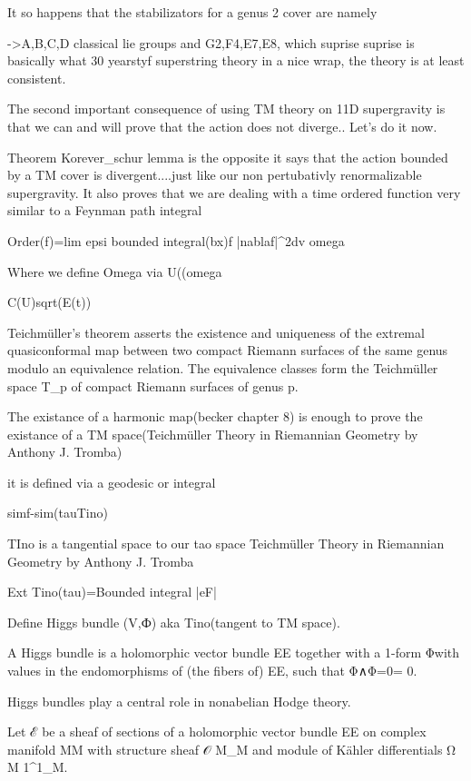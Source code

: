 It so happens that the stabilizators for a genus 2 cover are namely

->A,B,C,D classical lie groups and G2,F4,E7,E8, which suprise suprise is basically what 30 yearstyf superstring theory in a nice wrap, the theory is at least consistent.

The second important consequence of using TM theory on 11D supergravity is that we can and will prove that the action does not diverge.. Let's do it now.

Theorem Korever_schur lemma is the opposite it says that the action bounded by a TM cover is divergent....just like our non pertubativly renormalizable supergravity. It also proves that we are dealing with a time ordered function very similar to a Feynman path integral

Order(f)=lim epsi bounded integral(bx)f |nablaf|^2dv omega

Where we define Omega via U((omega 

C(U)sqrt(E(t))



Teichmüller's theorem asserts the existence and uniqueness of the extremal quasiconformal map between two compact Riemann surfaces of the same genus modulo an equivalence relation. The equivalence classes form the Teichmüller space T_p of compact Riemann surfaces of genus p. 

The existance of a harmonic map(becker chapter 8) is enough to prove the existance of a TM space(Teichmüller Theory in Riemannian Geometry by Anthony J. Tromba)

it is defined via a geodesic or integral

simf-sim(tauTino)

TIno is a tangential space to our tao space Teichmüller Theory in Riemannian Geometry by Anthony J. Tromba

Ext Tino(tau)=Bounded integral |eF|

Define Higgs bundle (V,Ф) aka Tino(tangent to TM space).

A Higgs bundle is a holomorphic vector bundle EE together with a 1-form Φ\Phi with values in the endomorphisms of (the fibers of) EE, such that Φ∧Φ=0\Phi \wedge \Phi = 0.

Higgs bundles play a central role in nonabelian Hodge theory.

Let ℰ be a sheaf of sections of a holomorphic vector bundle EE on complex manifold MM with structure sheaf 𝒪 M_M and module of Kähler differentials Ω M 1\Omega^1_M.

